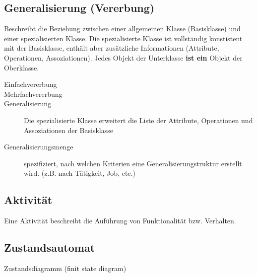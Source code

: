 \subsection{Generalisierung (Vererbung) }
  Beschreibt die Beziehung zwischen einer allgemeinen Klasse (Basisklasse) und
  einer spezialisierten Klasse. Die spezialisierte Klasse ist vollständig
  konstistent mit der Basisklasse, enthält aber zusätzliche Informationen
  (Attribute, Operationen, Assoziationen). Jedes Objekt der Unterklasse \textbf{ist ein} 
  Objekt der Oberklasse.
  
  \begin{description}
    \item[Einfachvererbung]
    \item[Mehrfachvererbung]
    \item[Generalisierung] 
      Die spezialisierte Klasse erweitert die Liste der
      Attribute, Operationen und Assoziationen der Basisklasse
    \item[Generalisierungsmenge] 
      spezifiziert, nach welchen Kriterien eine Generalisierungstruktur erstellt wird.
      (z.B. nach Tätigkeit, Job, etc.)
  \end{description}

\subsection{Aktivität }
  Eine Aktivität beschreibt die Auführung von Funktionalität bzw. Verhalten.

\subsection{Zustandsautomat }
  Zustandsdiagramm (finit state diagram)
 

\newpage

